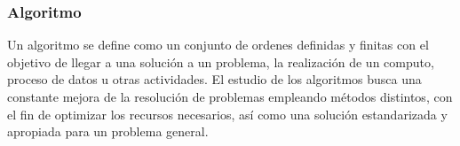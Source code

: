 \subsubsection{Algoritmo}

Un algoritmo se define como un conjunto de ordenes definidas y finitas con el objetivo de llegar a una solución a un problema, la realización de un computo, proceso de datos u otras actividades. El estudio de los algoritmos busca una constante mejora de la resolución de problemas empleando métodos distintos, con el fin de optimizar los recursos necesarios, así como una solución estandarizada y apropiada para un problema general.